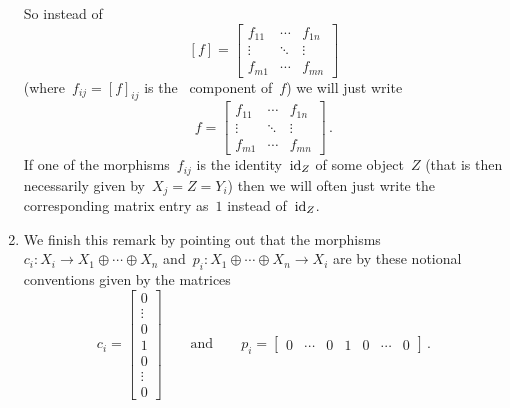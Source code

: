\begin{remark*}
\begin{enumerate}
      So instead of
      \[
          [f]
        = \begin{bmatrix}
            f_{11}  & \cdots  & f_{1n}  \\
            \vdots  & \ddots  & \vdots  \\
            f_{m1}  & \cdots  & f_{mn}
          \end{bmatrix}
      \]
      (where~$f_{ij} = [f]_{ij}$ is the~ component of~$f$) we will just write
      \[
          f
        = \begin{bmatrix}
            f_{11}  & \cdots  & f_{1n}  \\
            \vdots  & \ddots  & \vdots  \\
            f_{m1}  & \cdots  & f_{mn}
          \end{bmatrix} \,.
      \]
      If one of the morphisms~$f_{ij}$ is the identity~$\operatorname{id}_Z$ of some object~$Z$ (that is then necessarily given by~$X_j = Z = Y_i$) then we will often just write the corresponding matrix entry as~$1$ instead of~$\operatorname{id}_Z$.
    \item
      We finish this remark by pointing out that the morphisms~$c_i \colon X_i \to X_1 \oplus \dotsb \oplus X_n$ and~$p_i \colon X_1 \oplus \dotsb \oplus X_n \to X_i$ are by these notional conventions given by the matrices
      \[
          c_i
        = \begin{bmatrix}
            0 \\ \vdots \\ 0 \\ 1 \\ 0 \\ \vdots \\ 0
          \end{bmatrix}
        \qquad\text{and}\qquad
          p_i
        = \begin{bmatrix}
            0 & \cdots & 0 & 1 & 0 & \cdots & 0
          \end{bmatrix} \,.
      \]
  \end{enumerate}
\end{remark*}


